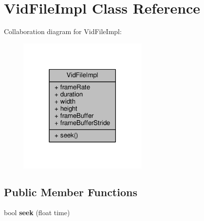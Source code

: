 \hypertarget{classVidFileImpl}{}\section{Vid\+File\+Impl Class Reference}
\label{classVidFileImpl}


Collaboration diagram for Vid\+File\+Impl\+:
\nopagebreak
\begin{figure}[H]
\begin{center}
\leavevmode
\includegraphics[width=182pt]{d7/dd8/classVidFileImpl__coll__graph}
\end{center}
\end{figure}
\subsection*{Public Member Functions}
\begin{DoxyCompactItemize}
\item 
bool {\bfseries seek} (float time)\hypertarget{classVidFileImpl_a5b0e590ccf5827941ada821a3af25cbc}{}\label{classVidFileImpl_a5b0e590ccf5827941ada821a3af25cbc}

\end{DoxyCompactItemize}
